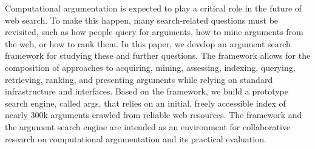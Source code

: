 Computational argumentation is expected to play a critical role in the future of web search. To make this happen, many search-related questions must be revisited, such as how people query for arguments, how to mine arguments from the web, or how to rank them. In this paper, we develop an argument search framework for studying these and further questions. The framework allows for the composition of approaches to acquiring, mining, assessing, indexing, querying, retrieving, ranking, and presenting arguments while relying on standard infrastructure and interfaces. Based on the framework, we build a prototype search engine, called args, that relies on an initial, freely accessible index of nearly 300k arguments crawled from reliable web resources. The framework and the argument search engine are intended as an environment for collaborative research on computational argumentation and its practical evaluation.
